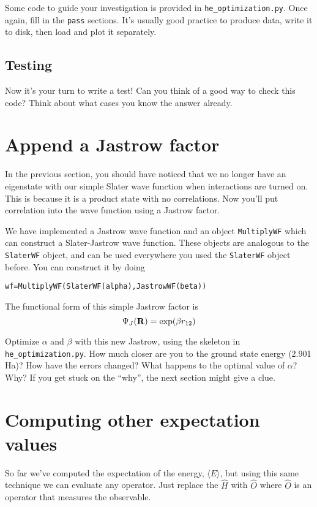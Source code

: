 \documentclass[12pt]{article}
\newcommand{\bR}{{\bf R}}
\begin{document}
Some code to guide your investigation is provided in \verb|he_optimization.py|. 
Once again, fill in the \verb|pass| sections.
It's usually good practice to produce data, write it to disk, then load and plot it separately. 

\subsection{Testing}

Now it's your turn to write a test! 
Can you think of a good way to check this code?
Think about what cases you know the answer already.

\section{Append a Jastrow factor} 

In the previous section, you should have noticed that we no longer have an eigenstate with our simple Slater wave function when interactions are turned on.
This is because it is a product state with no correlations. 
Now you'll put correlation into the wave function using a Jastrow factor.

We have implemented a Jastrow wave function and an object \verb|MultiplyWF| which can construct a Slater-Jastrow wave function.
These objects are analogous to the \verb|SlaterWF| object, and can be used everywhere you used the \verb|SlaterWF| object before.
You can construct it by doing
\begin{verbatim}
wf=MultiplyWF(SlaterWF(alpha),JastrowWF(beta))	
\end{verbatim}
The functional form of this simple Jastrow factor is 
\begin{equation}
\Psi_J(\bR) = \exp(\beta r_{12})	
\end{equation}

Optimize $\alpha$ and $\beta$ with this new Jastrow, using the skeleton in \verb|he_optimization.py|.
How much closer are you to the ground state energy (2.901 Ha)?
How have the errors changed?
What happens to the optimal value of $\alpha$? Why? 
If you get stuck on the ``why'', the next section might give a clue.

\section{Computing other expectation values}

So far we've computed the expectation of the energy, $\langle E \rangle$, but using this same technique we can evaluate any operator.
Just replace the $\hat{H}$ with $\hat{O}$ where $\hat{O}$ is an operator that measures the observable.
\end{document}
